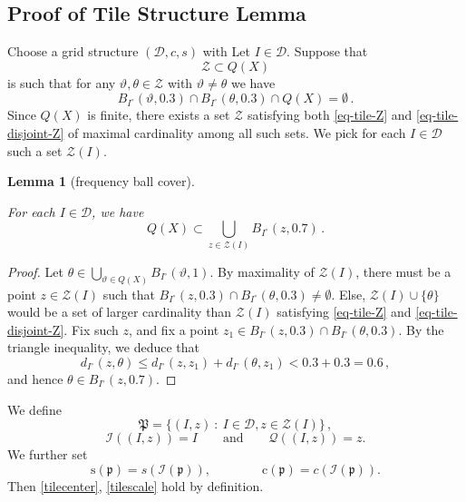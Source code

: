 \documentclass[10pt,a4paper]{article}
\theoremstyle{plain}
\newtheorem{lemma}[theorem]{Lemma}
\theoremstyle{definition}
\numberwithin{equation}{subsection}
\newcommand{\fp}{{\mathfrak p}}
\newcommand{\fP}{{\mathfrak P}}
\newcommand{\pc}{{\mathrm{c}}}
\newcommand{\ps}{{\mathrm{s}}}
\newcommand{\scI}{{\mathcal{I}}} %
\newcommand{\tQ}{{Q}}
\newcommand{\mfa}{{\vartheta}}
\newcommand{\mfb}{{\theta}}
\newcommand{\fcc}{{\mathcal{Q}}}
\newcommand{\lean}[1]{}
\newcommand{\leanok}{}
\begin{document}
\subsection{Proof of Tile Structure Lemma}
\label{subsectiles}
Choose a grid structure $(\mathcal{D}, c, s)$ with 
Let $I \in \mathcal{D}$. Suppose that
\begin{equation}
    \label{eq-tile-Z}
    \mathcal{Z} \subset \tQ(X)
\end{equation}
is such that for any $\mfa, \mfb \in \mathcal{Z}$ with $\mfa\ne \mfb$ we have
\begin{equation}
    \label{eq-tile-disjoint-Z}
    B_{I^\circ}(\mfa, 0.3) \cap B_{I^\circ}(\mfb, 0.3) \cap \tQ(X) = \emptyset\,.
\end{equation}
Since $\tQ(X)$ is finite, there exists a set $\mathcal{Z}$ satisfying both \eqref{eq-tile-Z} and \eqref{eq-tile-disjoint-Z} of maximal cardinality among all such sets. We pick for each $I \in \mathcal{D}$ such a set $\mathcal{Z}(I)$.

\begin{lemma}[frequency ball cover]
    \label{frequency-ball-cover}
    \leanok
    \lean{frequency_ball_cover}
    For each $I \in \mathcal{D}$, we have
    \begin{equation}
        \label{eq-tile-cover}
        \tQ(X) \subset \bigcup_{z \in \mathcal{Z}(I)} B_{I^\circ}(z, 0.7)\,.
    \end{equation}
\end{lemma}

\begin{proof}
    \leanok
    Let $\mfb \in \bigcup_{\mfa \in \tQ(X)} B_{I^\circ}(\mfa, 1)$. By maximality of $\mathcal{Z}(I)$, there must be a point $z \in \mathcal{Z}(I)$ such that $B_{I^\circ}(z, 0.3) \cap B_{I^\circ}(\mfb, 0.3) \ne \emptyset$. Else, $\mathcal{Z}(I) \cup \{\mfb\}$ would be a set of larger cardinality than $\mathcal{Z}(I)$ satisfying \eqref{eq-tile-Z} and \eqref{eq-tile-disjoint-Z}. Fix such $z$, and fix a point $z_1 \in B_{I^\circ}(z, 0.3) \cap B_{I^\circ}(\mfb, 0.3)$. By the triangle inequality, we deduce that
    $$
        d_{I^\circ}(z,\mfb) \le d_{I^\circ}(z,z_1) + d_{I^\circ}(\mfb, z_1) < 0.3 + 0.3 = 0.6\,,
    $$
    and hence $\mfb \in B_{I^\circ}(z, 0.7)$.
\end{proof}

We define
$$
    \fP = \{(I, z) \ : \ I \in \mathcal{D}, z \in \mathcal{Z}(I)\}\,,
$$
$$\scI((I, z)) = I\qquad \text{and} \qquad \fcc((I, z)) = z.$$ We further set $$\ps(\fp) = s(\scI(\fp)),\qquad \qquad \pc(\fp) = c(\scI(\fp)).$$ Then \eqref{tilecenter}, \eqref{tilescale} hold by definition.
\end{document}
